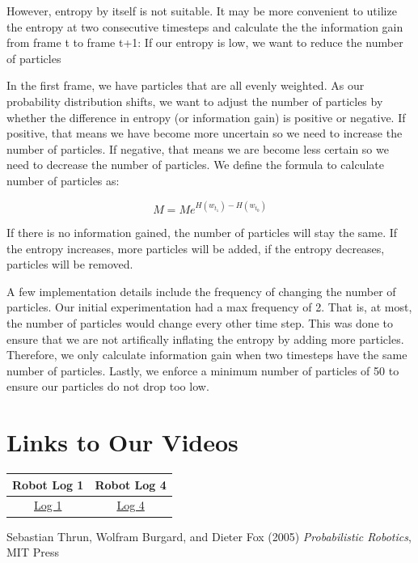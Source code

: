 \documentclass[12pt, a4paper]{article}
\begin{document}
However, entropy by itself is not suitable. It may be more convenient to utilize the entropy at two consecutive timesteps and calculate the the information gain from frame t to frame t+1:
If our entropy is low, we want to reduce the number of particles


In the first frame, we have particles that are all evenly weighted. As our probability distribution shifts, we want to adjust the number of particles by whether the difference in entropy (or information gain) is positive or negative. If positive, that means we have become more uncertain so we need to increase the number of particles. If negative, that means we are become less certain so we need to decrease the number of particles.
We define the formula to calculate number of particles as:

$$M = Me^{H(w_{t_1}) - H(w_{t_0})}$$

If there is no information gained, the number of particles will stay the same. If the entropy increases, more particles will be added, if the entropy decreases, particles will be removed.

A few implementation details include the frequency of changing the number of particles. Our initial experimentation had a max frequency of 2. That is, at most, the number of particles would change every other time step. This was done to ensure that we are not artifically inflating the entropy by adding more particles. Therefore, we only calculate information gain when two timesteps have the same number of particles. Lastly, we enforce a minimum number of particles of 50 to ensure our particles do not drop too low.

\section{Links to Our Videos}
\begin{tabular}{||c c||} 
  \hline
  Robot Log 1 & Robot Log 4 \\
  \hline
  \href{https://youtu.be/PKaJdCMeA9U}{Log 1} & \href{https://youtu.be/ilJhJMrWBzg}{Log 4} \\
  \hline
\end{tabular}

\clearpage
\begin{thebibliography}{9}
  Sebastian Thrun, Wolfram Burgard, and Dieter Fox (2005) \emph{Probabilistic Robotics}, MIT Press
\end{thebibliography}
\end{document}
